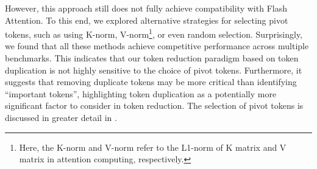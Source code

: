 However, this approach still does not fully achieve compatibility with Flash Attention. To this end, we explored alternative strategies for selecting pivot tokens, such as using K-norm, V-norm\footnote{Here, the K-norm and V-norm refer to the L1-norm of K matrix and V matrix in attention computing, respectively.}, or even random selection. Surprisingly, we found that all these methods achieve competitive performance across multiple benchmarks. This indicates that our token reduction paradigm based on token duplication is not highly sensitive to the choice of pivot tokens. Furthermore, it suggests that removing duplicate tokens may be more critical than identifying ``important tokens'', highlighting token duplication as a potentially more significant factor to consider in token reduction.
The selection of pivot tokens is discussed in greater detail in .

